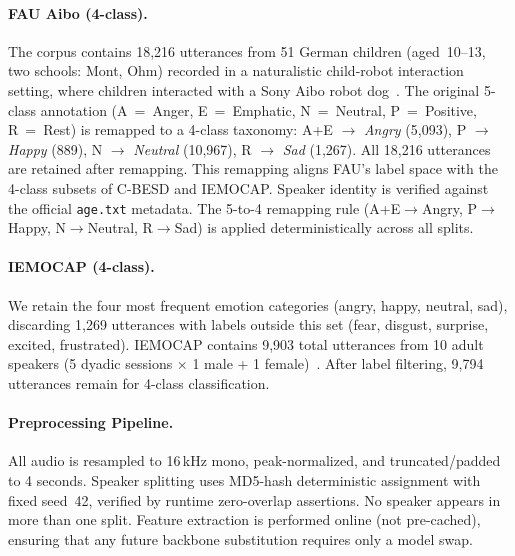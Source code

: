 \documentclass[11pt,a4paper]{article}
\begin{document}
\paragraph{FAU Aibo (4-class).} The corpus contains 18,216
utterances from 51 German children (aged~10--13, two schools: Mont, Ohm)
recorded in a naturalistic child-robot interaction setting, where children
interacted with a Sony Aibo robot dog~\cite{batliner2011fau,
schuller2009interspeech,steidl2009fau}. The original 5-class annotation (A~=~Anger,
E~=~Emphatic, N~=~Neutral, P~=~Positive, R~=~Rest) is remapped to a 4-class
taxonomy: A+E $\rightarrow$ \textit{Angry} (5,093), P $\rightarrow$
\textit{Happy} (889), N $\rightarrow$ \textit{Neutral} (10,967), R
$\rightarrow$ \textit{Sad} (1,267). All 18,216 utterances are retained after
remapping. This remapping aligns FAU's label space with the 4-class subsets of
C-BESD and IEMOCAP. Speaker identity is verified against the official
\texttt{age.txt} metadata. The 5-to-4 remapping rule (A+E$\rightarrow$Angry,
P$\rightarrow$Happy, N$\rightarrow$Neutral, R$\rightarrow$Sad) is applied
deterministically across all splits.

\paragraph{IEMOCAP (4-class).} We retain the four most frequent emotion
categories (angry, happy, neutral, sad), discarding 1,269 utterances with
labels outside this set (fear, disgust, surprise, excited, frustrated).
IEMOCAP contains 9,903 total utterances from 10 adult speakers (5 dyadic
sessions $\times$ 1 male + 1 female)~\cite{busso2008iemocap}. After label
filtering, 9,794 utterances remain for 4-class classification.

\paragraph{Preprocessing Pipeline.} All audio is resampled to 16\,kHz mono,
peak-normalized, and truncated/padded to 4 seconds. Speaker splitting uses
MD5-hash deterministic assignment with fixed seed~42, verified by runtime
zero-overlap assertions. No speaker appears in more than one split. Feature
extraction is performed online (not pre-cached), ensuring that any future
backbone substitution requires only a model swap.

\end{document}
